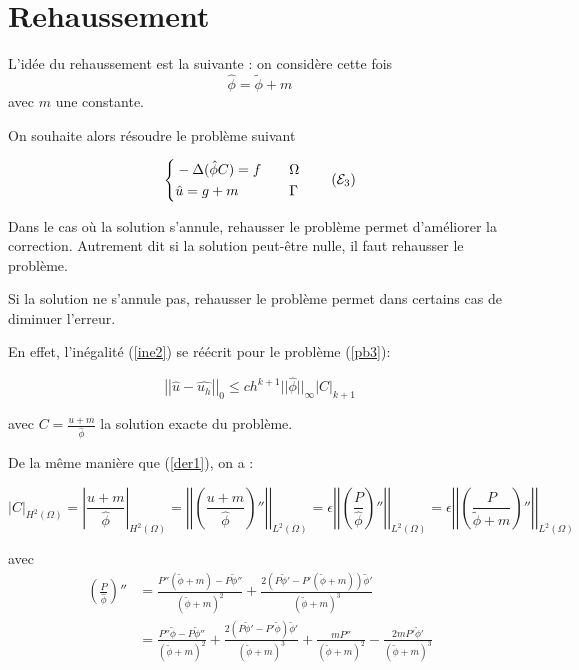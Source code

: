 \documentclass[french]{article}
\begin{document}
	\section*{Rehaussement}
	
	L'idée du rehaussement est la suivante : on considère cette fois
	$$\hat{\phi}=\tilde{\phi}+m$$
	avec $m$ une constante.
	
	On souhaite alors résoudre le problème suivant
	
	\begin{equation}
		\left\{\begin{aligned}
			&-\Delta (\hat{\phi}C)=f \quad &&\Omega \\
			&\hat{u}=g+m \quad &&\Gamma
		\end{aligned}\right. \label{pb3} \tag{$\mathcal{E}_3$}
	\end{equation}

	Dans le cas où la solution s'annule, rehausser le problème permet d'améliorer la correction. Autrement dit si la solution peut-être nulle, il faut rehausser le problème.
	
	Si la solution ne s'annule pas, rehausser le problème permet dans certains cas de diminuer l'erreur.
	
	En effet, l'inégalité (\ref{ine2}) se réécrit pour le problème (\ref{pb3}):
	
	\begin{equation}
		\left|\left|\hat{u}-\hat{u_h}\right|\right|_0\le ch^{k+1}||\hat{\phi}||_\infty\left|C\right|_{k+1}
		\label{ine3}
	\end{equation}
	
	avec $C=\frac{u+m}{\hat{\phi}}$ la solution exacte du problème.
	
	De la même manière que (\ref{der1}), on a :
	
	\begin{equation}
		|C|_{H^2(\Omega)}=\left|\frac{u+m}{\hat{\phi}}\right|_{H^2(\Omega)}=\left|\left|\left(\frac{u+m}{\hat{\phi}}\right)''\right|\right|_{L^2(\Omega)}=\epsilon\left|\left|\left(\frac{P}{\hat{\phi}}\right)''\right|\right|_{L^2(\Omega)}=\epsilon\left|\left|\left(\frac{P}{\tilde{\phi}+m}\right)''\right|\right|_{L^2(\Omega)} \label{der2}
	\end{equation}
	
	avec
	\begin{align*}
		\left(\frac{P}{\hat{\phi}}\right)''&=\frac{P''(\tilde{\phi}+m)-P\tilde{\phi}''}{(\tilde{\phi}+m)^2}+\frac{2(P\tilde{\phi}'-P'(\tilde{\phi}+m))\tilde{\phi}'}{(\tilde{\phi}+m)^3} \\
		&=\frac{P''\tilde{\phi}-P\tilde{\phi}''}{(\tilde{\phi}+m)^2}+\frac{2(P\tilde{\phi}'-P'\tilde{\phi})\tilde{\phi}'}{(\tilde{\phi}+m)^3}+    \frac{mP''}{(\tilde{\phi}+m)^2}-\frac{2mP'\tilde{\phi}'}{(\tilde{\phi}+m)^3}
	\end{align*}
\end{document}
